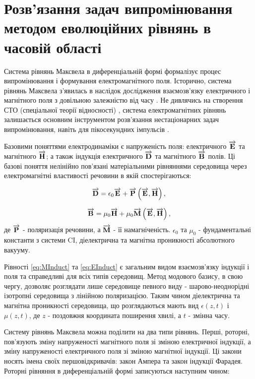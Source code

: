 \section{Розв'язання задач випромінювання методом еволюційних рівнянь
в часовій області}

Система рівнянь Максвела в диференціальній формі формалізує процес
випромінювання і формування електромагнітного поля. Історично, система рівнянь 
Максвела з'явилась в наслідок дослідження взаємозв'язку електричного і 
магнітного поля з довільною залежністю від часу \cite{imp:Maxwell1865}.
Не дивлячись на створення СТО (спеціальної теорії відносності) 
\cite{imp:Einstein1905}, система електромагнітних рівнянь залишається основним
інструментом розв'язання нестаціонарних задач випромінювання, навіть для 
пікосекундних імпульсів \cite{imp:Bray2006}.

Базовими поняттями електродинаміки є напруженість поля: електричного 
$ \overrightarrow{\mathbf E} $ та магнітного $ \overrightarrow{\mathbf H} $; а також індукція електричного 
$ \overrightarrow{\mathbf D} $ та магнітного $ \overrightarrow{\mathbf B} $ полів. Ці базові поняття нелінійно 
пов'язані матеріальними рівняннями середовища через електромагнітні 
властивості речовини в якій спостерігаються:

\begin{equation} \label{eq:MInduct}
\overrightarrow{\mathbf D} = \epsilon_0 \overrightarrow{\mathbf E} + \overrightarrow{\mathbf P} \left( \overrightarrow{\mathbf E},\overrightarrow{\mathbf H} \right),
\end{equation}

\begin{equation} \label{eq:EInduct} 
\overrightarrow{\mathbf B} = \mu_0 \overrightarrow{\mathbf H} + \mu_0 \overrightarrow{\mathbf M} \left( \overrightarrow{\mathbf E},\overrightarrow{\mathbf H} \right),
\end{equation}
%
де $ \overrightarrow{\mathbf P} $ - поляризація речовини, а $ \overrightarrow{\mathbf M} $ - її намагніченість.
$ \epsilon_0 $ та $ \mu_0 $ - фундаментальні константи з системи CI, 
діелектрична та магнітна проникності абсолютного вакууму.

Рівності \eqref{eq:MInduct} та \eqref{eq:EInduct} є загальним видом 
взаємозв'язку індукції і поля та справедливі для всіх типів середовищ.
Метод модового базису, в свою чергу, дозволяє розглядати лише середовище 
певного виду - шарово-неоднорідні ізотропні середовища з лінійною поляризацією.
Таким чином діелектрична та магнітна проникності середовища, що розглядаються 
мають вид $ \epsilon(z,t) $ і $ \mu(z,t) $, де $ z $ - поздовжня координата 
поширення хвилі, а $ t $ - змінна часу.

Систему рівнянь Максвела можна поділити на два типи рівнянь. Перші, роторні,
пов'язують зміну напруженості магнітного поля зі зміною електричної індукції, 
а зміну напруженості електричного поля зі зміною магнітної індукції. Ці закони 
носять імена своїх першовідкривачів: закон Ампера та закон індукції Фарадея.
Роторні рівняння в диференціальній формі записуються наступним чином:

